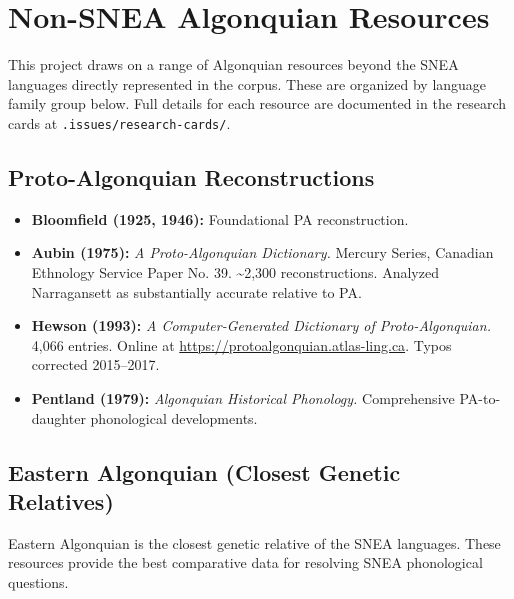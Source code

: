 
\section{Non-SNEA Algonquian Resources}
\label{sec:external}

This project draws on a range of Algonquian resources beyond the SNEA languages
directly represented in the corpus. These are organized by language family group
below. Full details for each resource are documented in the research cards at
\texttt{.issues/research-cards/}.

\subsection{Proto-Algonquian Reconstructions}

\begin{itemize}
  \item \textbf{Bloomfield (1925, 1946):} Foundational PA reconstruction.
  \item \textbf{Aubin (1975):} \emph{A Proto-Algonquian Dictionary.} Mercury
    Series, Canadian Ethnology Service Paper No. 39. \textasciitilde2,300
    reconstructions. Analyzed Narragansett as substantially accurate relative
    to PA.
  \item \textbf{Hewson (1993):} \emph{A Computer-Generated Dictionary of
    Proto-Algonquian.} 4,066 entries. Online at
    \url{https://protoalgonquian.atlas-ling.ca}. Typos corrected 2015--2017.
  \item \textbf{Pentland (1979):} \emph{Algonquian Historical Phonology.}
    Comprehensive PA-to-daughter phonological developments.
\end{itemize}

\subsection{Eastern Algonquian (Closest Genetic Relatives)}

Eastern Algonquian is the closest genetic relative of the SNEA languages.
These resources provide the best comparative data for resolving SNEA
phonological questions.


